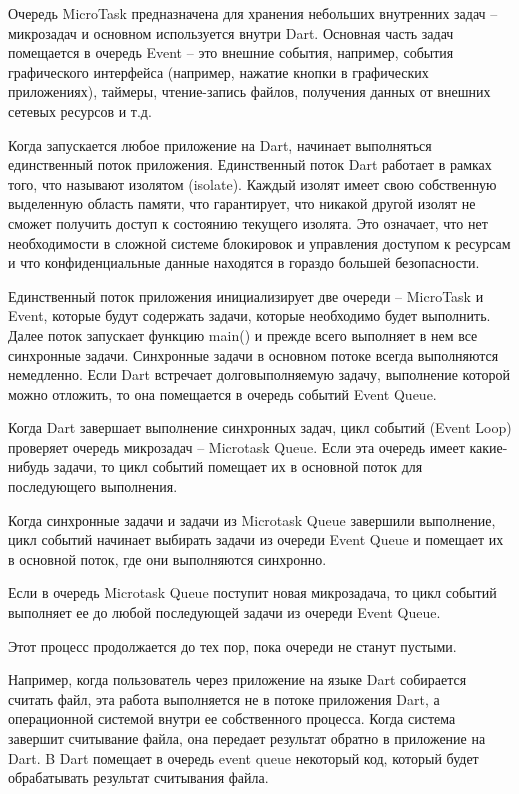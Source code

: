 Очередь MicroTask предназначена для хранения небольших внутренних задач – микрозадач и основном используется внутри Dart. Основная часть задач помещается в очередь Event – это внешние события, например, события графического интерфейса (например, нажатие кнопки в графических приложениях), таймеры, чтение-запись файлов, получения данных от внешних сетевых ресурсов и т.д.

Когда запускается любое приложение на Dart, начинает выполняться единственный поток приложения. Единственный поток Dart работает в рамках того, что называют изолятом (isolate). Каждый изолят имеет свою собственную выделенную область памяти, что гарантирует, что никакой другой изолят не сможет получить доступ к состоянию текущего изолята. Это означает, что нет необходимости в сложной системе блокировок и управления доступом к ресурсам и что конфиденциальные данные находятся в гораздо большей безопасности.

Единственный поток приложения инициализирует две очереди – MicroTask и Event, которые будут содержать задачи, которые необходимо будет выполнить. Далее поток запускает функцию main() и прежде всего выполняет в нем все синхронные задачи. Синхронные задачи в основном потоке всегда выполняются немедленно. Если Dart встречает долговыполняемую задачу, выполнение которой можно отложить, то она помещается в очередь событий Event Queue.

Когда Dart завершает выполнение синхронных задач, цикл событий (Event Loop) проверяет очередь микрозадач – Microtask Queue. Если эта очередь имеет какие-нибудь задачи, то цикл событий помещает их в основной поток для последующего выполнения.

Когда синхронные задачи и задачи из Microtask Queue завершили выполнение, цикл событий начинает выбирать задачи из очереди Event Queue и помещает их в основной поток, где они выполняются синхронно.

Если в очередь Microtask Queue поступит новая микрозадача, то цикл событий выполняет ее до любой последующей задачи из очереди Event Queue.

Этот процесс продолжается до тех пор, пока очереди не станут пустыми.

Например, когда пользователь через приложение на языке Dart собирается считать файл, эта работа выполняется не в потоке приложения Dart, а операционной системой внутри ее собственного процесса. Когда система завершит считывание файла, она передает результат обратно в приложение на Dart. B Dart помещает в очередь event queue некоторый код, который будет обрабатывать результат считывания файла.

